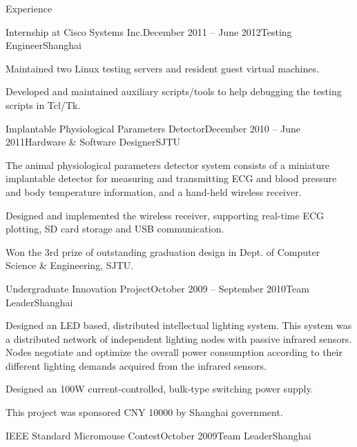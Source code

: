 \documentclass{resume} %
\begin{document}
\begin{rSection}{Experience}
\begin{rSubsection}{Internship at Cisco Systems Inc.}{December 2011 -- June 2012}{Testing Engineer}{Shanghai}
    \item Maintained two Linux testing servers and resident guest virtual
        machines.

    \item Developed and maintained auxiliary scripts/tools to help debugging
        the testing scripts in Tcl/Tk.

    \end{rSubsection}

    \begin{rSubsection}{Implantable Physiological Parameters Detector}{December 2010 -- June 2011}{Hardware \& Software Designer}{SJTU}

    \item The animal physiological parameters detector system consists of a
        miniature implantable detector for measuring and transmitting ECG and
        blood pressure and body temperature information, and a hand-held
        wireless receiver.

    \item Designed and implemented the wireless receiver, supporting real-time
        ECG plotting, SD card storage and USB communication.

    \item Won the 3rd prize of outstanding graduation design in Dept. of Computer
        Science \& Engineering, SJTU.

    \end{rSubsection}

    \begin{rSubsection}{Undergraduate Innovation Project}{October 2009 -- September 2010}{Team Leader}{Shanghai}

    \item Designed an LED based, distributed intellectual lighting system. This
        system was a distributed network of independent lighting nodes with
        passive infrared sensors. Nodes negotiate and optimize the overall
        power consumption according to their different lighting demands
        acquired from the infrared sensors.

    \item Designed an 100W current-controlled, bulk-type switching power
        supply.

    \item This project was sponsored CNY 10000 by Shanghai government.

    \end{rSubsection}

    \begin{rSubsection}{IEEE Standard Micromouse Contest}{October 2009}{Team Leader}{Shanghai}


\end{rSubsection}
\end{rSection}
\end{document}
